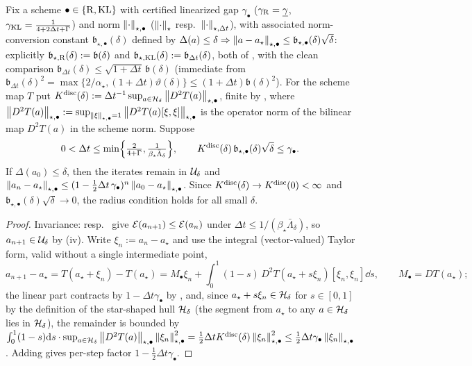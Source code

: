 \begin{proposition}
\label{thm:disc-local}
Fix a scheme $\bullet\in\{\mathrm{R},\mathrm{KL}\}$ with certified linearized gap $\gamma_\bullet$
($\gamma_{\mathrm{R}}=\underline{\gamma}$, $\gamma_{\mathrm{KL}}=\tfrac1{4+2\Delta t+\Gamma}$) and norm $\left\lVert \cdot\right\rVert_{\star,\bullet}$
($\left\lVert \cdot\right\rVert_\star$ resp.\ $\left\lVert \cdot\right\rVert_{\star,\Delta t}$), with associated norm-conversion constant
$\mathfrak b_{\star,\bullet}(\delta)$ defined by $\Delta(a)\leq\delta\Rightarrow\left\lVert a-a_\star\right\rVert_{\star,\bullet}\leq\mathfrak b_{\star,\bullet}(\delta)\sqrt\delta$:
explicitly $\mathfrak b_{\star,\mathrm{R}}(\delta):=\mathfrak b(\delta)$ and
$\mathfrak b_{\star,\mathrm{KL}}(\delta):=\mathfrak b_{\Delta t}(\delta)$, both of , with the clean
comparison $\mathfrak b_{\Delta t}(\delta)\leq\sqrt{1+\Delta t}\,\mathfrak b(\delta)$ (immediate from
$\mathfrak b_{\Delta t}(\delta)^2=\max\{2/\alpha_\star,(1+\Delta t)\vartheta(\delta)\}\leq(1+\Delta t)\mathfrak b(\delta)^2$).
For the scheme map $T$ put
$K^{\mathrm{disc}}(\delta):=\Delta t^{-1}\sup_{a\in\mathcal{H}_\delta}\left\lVert D^2T(a)\right\rVert_{\star,\bullet}$, finite by
, where $\left\lVert D^2T(a)\right\rVert_{\star,\bullet}:=\sup_{\left\lVert \xi\right\rVert_{\star,\bullet}=1}\left\lVert D^2T(a)[\xi,\xi]\right\rVert_{\star,\bullet}$
is the operator norm of the bilinear map $D^2T(a)$ in the scheme norm. Suppose
\[
    0<\Delta t\leq\min\Bigl\{\tfrac2{4+\Gamma},\tfrac1{\beta_\star\bar\Lambda_\delta}\Bigr\},
    \qquad
    K^{\mathrm{disc}}(\delta)\,\mathfrak b_{\star,\bullet}(\delta)\sqrt\delta\leq\gamma_\bullet .
\]
If $\Delta(a_0)\leq\delta$, then the iterates remain in $\mathcal{U}_\delta$ and
$\left\lVert a_n-a_\star\right\rVert_{\star,\bullet}\leq(1-\tfrac12\Delta t\,\gamma_\bullet)^n\left\lVert a_0-a_\star\right\rVert_{\star,\bullet}$.
Since $K^{\mathrm{disc}}(\delta)\to K^{\mathrm{disc}}(0)<\infty$ and $\mathfrak b_{\star,\bullet}(\delta)\sqrt\delta\to0$, the
radius condition holds for all small $\delta$.
\end{proposition}

\begin{proof}
Invariance:  resp.\  give $\mathcal{E}(a_{n+1})\leq\mathcal{E}(a_n)$
under $\Delta t\leq1/(\beta_\star\bar\Lambda_\delta)$, so $a_{n+1}\in\mathcal{U}_\delta$ by
(iv). Write $\xi_n:=a_n-a_\star$ and use the integral (vector-valued) Taylor
form, valid without a single intermediate point,
\[
    a_{n+1}-a_\star=T(a_\star+\xi_n)-T(a_\star)
    =M_\bullet\xi_n+\int_0^1(1-s)\,D^2T(a_\star+s\xi_n)[\xi_n,\xi_n]\dd s,
    \qquad M_\bullet=DT(a_\star);
\]
the linear part contracts by $1-\Delta t\gamma_\bullet$ by , and, since
$a_\star+s\xi_n\in\mathcal{H}_\delta$ for $s\in[0,1]$ by the definition of the star-shaped hull $\mathcal{H}_\delta$
(the segment from $a_\star$ to any $a\in\mathcal{H}_\delta$ lies in $\mathcal{H}_\delta$), the remainder is
bounded by $\int_0^1(1-s)\mathrm{d} s\cdot\sup_{a\in\mathcal{H}_\delta}\left\lVert D^2T(a)\right\rVert_{\star,\bullet}\left\lVert \xi_n\right\rVert_{\star,\bullet}^2
=\tfrac12\Delta tK^{\mathrm{disc}}(\delta)\left\lVert \xi_n\right\rVert_{\star,\bullet}^2\leq\tfrac12\Delta t\gamma_\bullet\left\lVert \xi_n\right\rVert_{\star,\bullet}$.
Adding gives per-step factor $1-\tfrac12\Delta t\gamma_\bullet$.
\end{proof}

